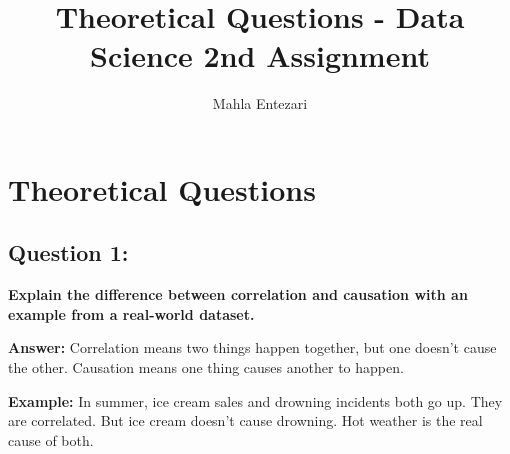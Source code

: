\documentclass{article}
\title{Theoretical Questions - Data Science 2nd Assignment}
\author{Mahla Entezari}
\date{}
\begin{document}
\maketitle

\section*{Theoretical Questions}

\subsection*{Question 1:}
\textbf{Explain the difference between correlation and causation with an example from a real-world dataset.}

\textbf{Answer:} Correlation means two things happen together, but one doesn’t cause the other. Causation means one thing causes another to happen.

\textbf{Example:} In summer, ice cream sales and drowning incidents both go up. They are correlated. But ice cream doesn't cause drowning. Hot weather is the real cause of both.
\end{document}
